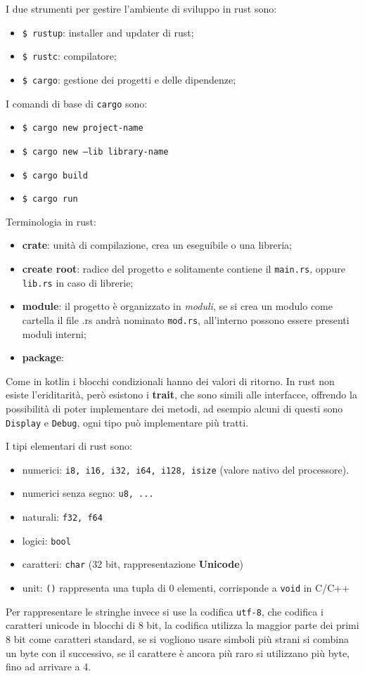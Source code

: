 \documentclass[12pt]{article}
\begin{document}
I due strumenti per gestire l'ambiente di sviluppo in rust sono:
\begin{itemize}
  \item \texttt{\$ rustup}: installer and updater di rust;
  \item \texttt{\$ rustc}: compilatore;
  \item \texttt{\$ cargo}: gestione dei progetti e delle dipendenze;
\end{itemize}
I comandi di base di \texttt{cargo} sono:
\begin{itemize}
  \item \texttt{\$ cargo new project-name}
  \item \texttt{\$ cargo new --lib library-name}
  \item \texttt{\$ cargo build}
  \item \texttt{\$ cargo run}
\end{itemize}
Terminologia in rust:
\begin{itemize}
  \item \textbf{crate}: unit\`a di compilazione, crea un eseguibile o una libreria;
  \item \textbf{create root}: radice del progetto e solitamente contiene il \texttt{main.rs}, oppure \texttt{lib.rs} in caso di librerie;
  \item \textbf{module}: il progetto \`e organizzato in \emph{moduli}, se si crea un modulo come cartella il file .rs andr\`a nominato \texttt{mod.rs}, all'interno possono essere presenti moduli interni;
  \item \textbf{package}: 
\end{itemize}
Come in kotlin i blocchi condizionali hanno dei valori di ritorno. In rust non esiste l'eriditarit\`a, per\`o esistono i \textbf{trait}, che sono simili alle interfacce, offrendo la possibilit\`a di poter implementare dei metodi, ad esempio alcuni di questi sono \texttt{Display} e \texttt{Debug}, ogni tipo pu\`o implementare pi\`u tratti.

I tipi elementari di rust sono:
\begin{itemize}
  \item numerici: \texttt{i8, i16, i32, i64, i128, isize} (valore nativo del processore).
  \item numerici senza segno: \texttt{u8, ...}
  \item naturali: \texttt{f32, f64}
  \item logici: \texttt{bool}
  \item caratteri: \texttt{char} (32 bit, rappresentazione \textbf{Unicode})
  \item unit: \texttt{()} rappresenta una tupla di 0 elementi, corrisponde a \texttt{void} in C/C++
\end{itemize}
Per rappresentare le stringhe invece si use la codifica \texttt{utf-8}, che codifica i caratteri unicode in blocchi di 8 bit, la codifica utilizza la maggior parte dei primi 8 bit come caratteri standard, se si vogliono usare simboli pi\`u strani si combina un byte con il successivo, se il carattere \`e ancora pi\`u raro si utilizzano pi\`u byte, fino ad arrivare a 4. 
\end{document}
